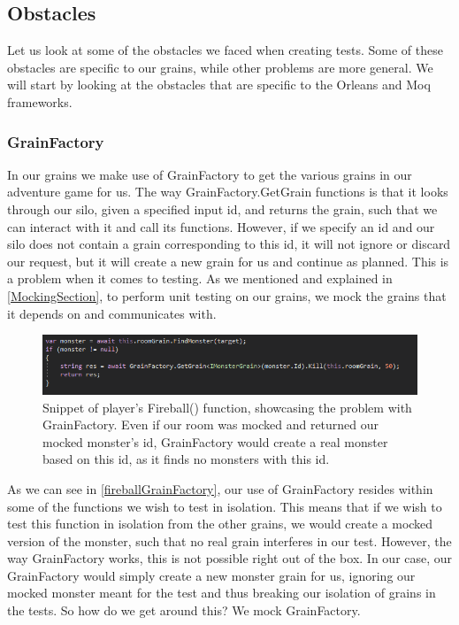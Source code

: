 \subsection{Obstacles}
Let us look at some of the obstacles we faced when creating tests. Some of these obstacles are specific to our grains, while other problems are more general. We will start by looking at the obstacles that are specific to the Orleans and Moq frameworks.
\subsubsection{GrainFactory} \label{GrainFactorySection}
In our grains we make use of GrainFactory to get the various grains in our adventure game for us. The way GrainFactory.GetGrain functions is that it looks through our silo, given a specified input id, and returns the grain, such that we can interact with it and call its functions. However, if we specify an id and our silo does not contain a grain corresponding to this id, it will not ignore or discard our request, but it will create a new grain for us and continue as planned. This is a problem when it comes to testing. As we mentioned and explained in \autoref{MockingSection}, to perform unit testing on our grains, we mock the grains that it depends on and communicates with. 
\begin{figure}[h]
    \centering
    \includegraphics[width=\linewidth]{Materials/TestingTheory/FireballGrainFactory}
    \caption{Snippet of player's Fireball() function, showcasing the problem with GrainFactory. Even if our room was mocked and returned our mocked monster's id, GrainFactory would create a real monster based on this id, as it finds no monsters with this id.}
    \label{fireballGrainFactory}
\end{figure}
As we can see in \autoref{fireballGrainFactory}, our use of GrainFactory resides within some of the functions we wish to test in isolation. This means that if we wish to test this function in isolation from the other grains, we would create a mocked version of the monster, such that no real grain interferes in our test. However, the way GrainFactory works, this is not possible right out of the box. In our case, our GrainFactory would simply create a new monster grain for us, ignoring our mocked monster meant for the test and thus breaking our isolation of grains in the tests. So how do we get around this? We mock GrainFactory. \\
